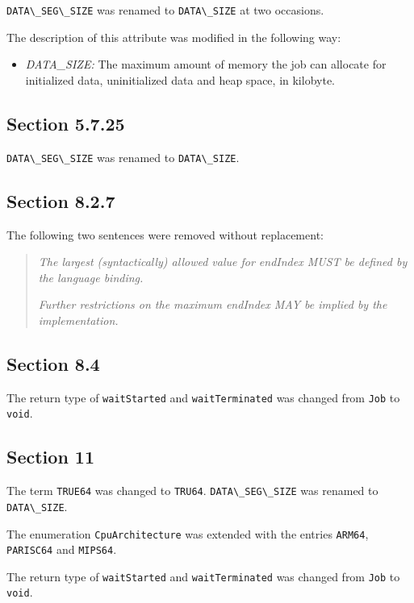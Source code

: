 \documentclass{article}
\newcommand{\h}[1]{\lstinline|#1|}
\begin{document}
\h{DATA\_SEG\_SIZE} was renamed to \h{DATA\_SIZE} at two occasions.

The description of this attribute was modified in the following way:

\begin{itemize}
\item \emph{DATA\_SIZE:} The maximum amount of memory the job can allocate for initialized data, uninitialized data and heap space, in kilobyte.
\end{itemize}

\subsection*{Section 5.7.25}

\h{DATA\_SEG\_SIZE} was renamed to \h{DATA\_SIZE}.
 
\subsection*{Section 8.2.7}

The following two sentences were removed without replacement:

\begin{quote}
\emph{The largest (syntactically) allowed value for endIndex MUST be defined by the language binding.}

\emph{Further restrictions on the maximum endIndex MAY be implied by the implementation.}
\end{quote} 
 
\subsection*{Section 8.4}

The return type of \h{waitStarted} and \h{waitTerminated} was changed from \h{Job} to \h{void}. 
 
\subsection*{Section 11}

The term \h{TRUE64} was changed to \h{TRU64}. \h{DATA\_SEG\_SIZE} was renamed to \h{DATA\_SIZE}. 

The enumeration \h{CpuArchitecture} was extended with the entries \h{ARM64}, \h{PARISC64} and \h{MIPS64}.

The return type of \h{waitStarted} and \h{waitTerminated} was changed from \h{Job} to \h{void}. 
\end{document}
